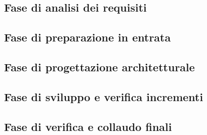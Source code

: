 \documentclass[../piano-di-progetto.tex]{subfiles}
\begin{document}
\subsection{Fase di analisi dei requisiti}%
\label{sub:fase_di_analisi_dei_requisiti}

\subsection{Fase di preparazione in entrata}%
\label{sub:fase_di_preparazione_in_entrata}

\subsection{Fase di progettazione architetturale}%
\label{sub:fase_di_progettazione_architetturale}

\subsection{Fase di sviluppo e verifica incrementi}%
\label{sub:fase_di_sviluppo_e_verifica_incrementi}

\subsection{Fase di verifica e collaudo finali}%
\label{sub:fase_di_verifica_e_collaudo_finali}

\end{document}
